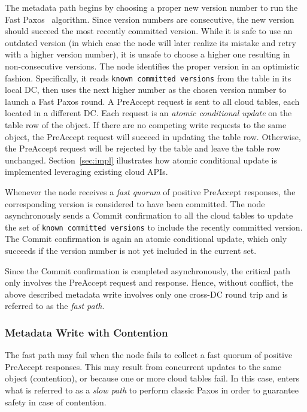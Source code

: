 The metadata path begins by choosing a proper new version number to run the
Fast Paxos~\cite{lamport05fast} algorithm. Since version numbers are
consecutive, the new version should succeed the most recently committed
version. While it is safe to use an outdated version (in which case the {\name}
node will later realize its mistake and retry with a higher version number), it
is unsafe to choose a higher one resulting in non-consecutive versions. The
{\name} node identifies the proper version in an optimistic fashion.
Specifically, it reads {\tt known committed versions} from the table in its
local DC, then uses the next higher number as the chosen version number to
launch a Fast Paxos round.
A PreAccept request is sent to all cloud tables, each located in a different DC.
Each request is an {\em atomic conditional update} on the table row of the object.
If there are no competing write requests to the same object, the PreAccept request will succeed in updating the table row.
Otherwise, the PreAccept request will be rejected by the table and leave the table row unchanged.
Section~\ref{sec:impl} illustrates how atomic conditional update is implemented leveraging existing cloud APIs.

Whenever the {\name} node receives a {\em fast quorum} of positive PreAccept responses,
the corresponding version is considered to have been committed.
The {\name} node asynchronously sends a Commit confirmation to all the cloud tables to update 
the set of {\tt known committed versions} to include the recently committed version.
The Commit confirmation is again an atomic conditional update,
which only succeeds if the version number is not yet included in the current set.

Since the Commit confirmation is completed asynchronously,
the critical path only involves the PreAccept request and response.
Hence, without conflict, the above described metadata write involves only one cross-DC round trip 
and is referred to as the {\em fast path}. 

\subsubsection{Metadata Write with Contention}

The fast path may fail when the {\name} node fails to collect a fast quorum of positive PreAccept responses. 
This may result from concurrent updates to the same object (contention), or because one or more cloud tables fail.  
In this case, {\name} enters what is referred to as a
\emph{slow path} to perform classic Paxos in order to guarantee safety in case of
contention.

